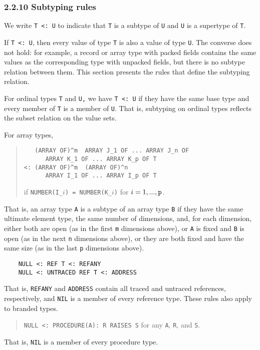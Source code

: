 \documentclass[10pt]{article}
\begin{document}
\subsubsection*{2.2.10 Subtyping rules}

We write \verb|T <: U| to indicate that \verb|T| is a subtype of \verb|U| and
\verb|U| is a supertype of \verb|T|.

If \verb|T <: U|, then every value of type \verb|T| is also a value of type
\verb|U|.  The converse does not hold: for example, a record or array type
with packed fields contains the same values as the corresponding type with
unpacked fields, but there is no subtype relation between them.  This section
presents the rules that define the subtyping relation.

For ordinal types \verb|T| and \verb|U,| we have \verb|T <: U| if they have
the same base type and every member of \verb|T| is a member of \verb|U|.  That
is, subtyping on ordinal types reflects the subset relation on the value sets.

For array types,
\begin{quote}
\begin{verbatim}
   (ARRAY OF)^m  ARRAY J_1 OF ... ARRAY J_n OF
      ARRAY K_1 OF ... ARRAY K_p OF T
<: (ARRAY OF)^m  (ARRAY OF)^n
      ARRAY I_1 OF ... ARRAY I_p OF T
\end{verbatim}
  if \verb|NUMBER(I_|$i$\verb|) = NUMBER(K_|$i$\verb|)|
  for $i = 1, ..., \verb|p|$.
\end{quote}
That is, an array type \verb|A| is a subtype of an array type \verb|B| if they
have the same ultimate element type, the same number of dimensions, and, for
each dimension, either both are open (as in the first \verb|m| dimensions
above), or \verb|A| is fixed and \verb|B| is open (as in the next \verb|n|
dimensions above), or they are both fixed and have the same size (as in the
last \verb|p| dimensions above).

\begin{verbatim}
    NULL <: REF T <: REFANY
    NULL <: UNTRACED REF T <: ADDRESS
\end{verbatim}
That is, \verb|REFANY| and \verb|ADDRESS| contain all traced and untraced
references, respectively, and \verb|NIL| is a member of every reference type.
These rules also apply to branded types.

\begin{quote}
  \verb|NULL <: PROCEDURE(A): R RAISES S| for any \verb|A|, \verb|R|, and
  \verb|S|.
\end{quote}
That is, \verb|NIL| is a member of every procedure type.
\end{document}
